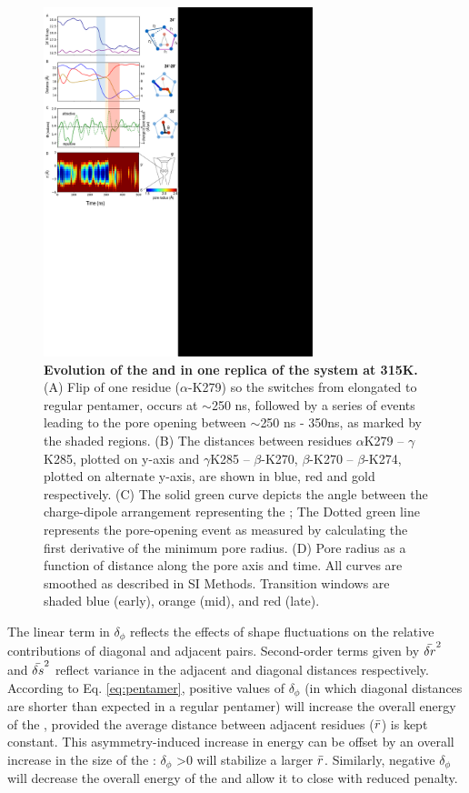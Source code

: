 \documentclass[9pt,twocolumn,twoside,lineno]{pnas-new}
\begin{document}
\begin{figure}[t]
\begin{center}
\includegraphics[height = 4in]{figures_2/cartoon_theory.pdf}
\caption{{\bf Evolution of the \fivering and \triad in one replica of the \WT system at 315K.} (A) Flip of one residue ($\alpha$-K279) so the \fivering switches from elongated to regular pentamer, occurs at $\sim$250 ns, followed by a series of events leading to the pore opening between $\sim$250 ns - 350ns, as marked by the shaded regions. (B) The distances between residues $\alpha$K279 -- $\gamma$K285, plotted on y-axis and  $\gamma$K285 -- $\beta$-K270, $\beta$-K270 -- $\beta$-K274, plotted on alternate y-axis, are shown in blue, red and gold respectively. (C) The solid green curve depicts the angle between the charge-dipole arrangement representing the \triad; The Dotted green line represents the pore-opening event as measured by calculating the  first derivative of the minimum pore radius. (D) Pore radius as a function of distance along the pore axis and time.  All curves are smoothed as described in SI Methods.  Transition windows are shaded blue (early), orange (mid), and red (late).   }
\label{fig:theory}
\end{center}
\end{figure}

The linear term in $\delta_{\phi}$ reflects the effects of shape fluctuations on the relative contributions of diagonal and adjacent pairs.   Second-order terms given by $\bar{\delta r}^{2}$ and $\bar{\delta s}^{2}$ reflect variance in the adjacent and diagonal distances respectively.  According to Eq. \ref{eq:pentamer}, positive values of $\delta_{\phi}$ (in which diagonal distances are shorter than expected in a regular pentamer) will increase the overall energy of the \fiveringnos, provided the average distance between adjacent residues ($\bar{r}$) is kept constant.  This asymmetry-induced increase in energy can be offset by an overall increase in the size of the \fivering: $\delta_{\phi}$ >0  will stabilize a larger $\bar{r}$.  Similarly, negative $\delta_{\phi}$ will decrease the overall energy of the \fivering and allow it to close with reduced penalty.  
\end{document}
